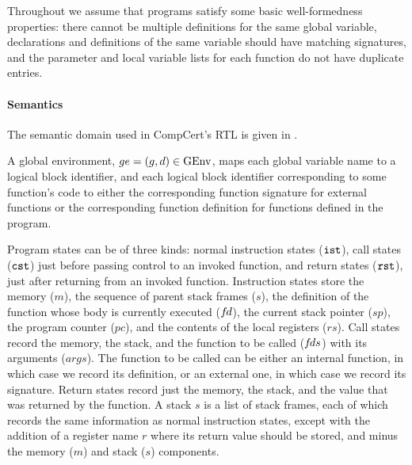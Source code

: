 Throughout we assume that programs satisfy some basic well-formedness properties: there cannot be
multiple definitions for the same global variable, declarations and definitions of the same variable
should have matching signatures, and the parameter and local variable lists for each function do not
have duplicate entries.


\paragraph{Semantics}



The semantic domain used in CompCert's RTL is given in .


A global environment, $ge=(g,d)\in\mathrm{GEnv}$, maps each global variable name to a logical block
identifier, and each logical block identifier corresponding to some function's code to either the
corresponding function signature for external functions or the corresponding function definition for
functions defined in the program.

Program states can be of three kinds: normal instruction states ($\mathtt{ist}$), call states ($\mathtt{cst}$)
just before passing control to an invoked function, and return states ($\mathtt{rst}$), just after
returning from an invoked function.  Instruction states store the memory ($m$), the sequence of
parent stack frames ($s$), the definition of the function whose body is currently executed (${f\hspace*{-1pt}d}$),
the current stack pointer ($sp$), the program counter ($pc$), and the contents of the local
registers ($rs$).  Call states record the memory, the stack, and the function to be called (${f\hspace*{-1pt}ds}$)
with its arguments ($args$).  The function to be called can be either an internal function, in which
case we record its definition, or an external one, in which case we record its signature.  Return
states record just the memory, the stack, and the value that was returned by the function.  A stack
$s$ is a list of stack frames, each of which records the same information as normal instruction
states, except with the addition of a register name $r$ where its return value should be stored, and
minus the memory ($m$) and stack ($s$) components.

